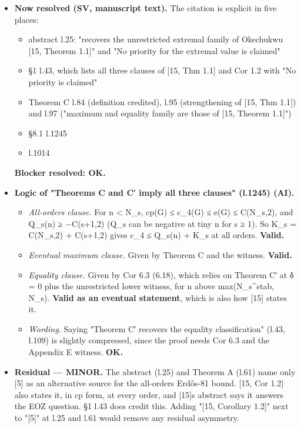 \documentclass[
]{article}
\providecommand{\tightlist}{%
  \setlength{\itemsep}{0pt}\setlength{\parskip}{0pt}}
\begin{document}
\begin{itemize}
\item
  \textbf{Now resolved (SV, manuscript text).} The citation is explicit
  in five places:

  \begin{itemize}
  \tightlist
  \item
    abstract l.25: "recovers the unrestricted extremal family of
    Okechukwu {[}15, Theorem 1.1{]}" and "No priority for the extremal
    value is claimed"
  \item
    §1 l.43, which lists all three clauses of {[}15, Thm 1.1{]} and Cor
    1.2 with "No priority is claimed"
  \item
    Theorem C l.84 (definition credited), l.95 (strengthening of {[}15,
    Thm 1.1{]}) and l.97 ("maximum and equality family are those of
    {[}15, Theorem 1.1{]}")
  \item
    §8.1 l.1245
  \item
    l.1014
  \end{itemize}

  \textbf{Blocker resolved: OK.}
\item
  \textbf{Logic of "Theorems C and C′ imply all three clauses" (l.1245)
  (AI).}

  \begin{itemize}
  \tightlist
  \item
    \emph{All-orders clause.} For n \textless{} N\_s, cp(G) ≤ c\_4(G) ≤
    e(G) ≤ C(N\_s,2), and Q\_s(n) ≥ −C(s+1,2) (Q\_s can be negative at
    tiny n for s ≥ 1). So K\_s = C(N\_s,2) + C(s+1,2) gives c\_4 ≤
    Q\_s(n) + K\_s at all orders. \textbf{Valid.}
  \item
    \emph{Eventual maximum clause.} Given by Theorem C and the witness.
    \textbf{Valid.}
  \item
    \emph{Equality clause.} Given by Cor 6.3 (6.18), which relies on
    Theorem C′ at δ = 0 plus the unrestricted lower witness, for n above
    max(N\_s\^{}stab, N\_s). \textbf{Valid as an eventual statement},
    which is also how {[}15{]} states it.
  \item
    \emph{Wording.} Saying "Theorem C′ recovers the equality
    classification" (l.43, l.109) is slightly compressed, since the
    proof needs Cor 6.3 and the Appendix E witness. \textbf{OK.}
  \end{itemize}
\item
  \textbf{Residual --- MINOR.} The abstract (l.25) and Theorem A (l.61)
  name only {[}5{]} as an alternative source for the all-orders Erdős-81
  bound. {[}15, Cor 1.2{]} also states it, in cp form, at every order,
  and {[}15{]}\textquotesingle s abstract says it answers the EOZ
  question. §1 l.43 does credit this. Adding "{[}15, Corollary 1.2{]}"
  next to "{[}5{]}" at l.25 and l.61 would remove any residual
  asymmetry.
\end{itemize}
\end{document}
